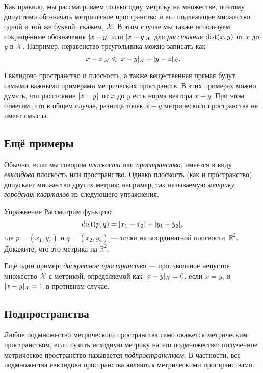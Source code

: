 \begin{multicols}{2}
{Как правило, мы рассматриваем только одну метрику на множестве, поэтому допустимо обозначать метрическое пространство и его подлежащее множество одной и той же буквой, скажем, $\mathcal{X}$.
В этом случае мы также используем сокращённые обозначения $\dist{x}{y}{}$ или $\dist{x}{y}{\spc{X}}$ для \emph{расстояния} $\mathop{\rm dist}\nolimits(x,y)$ от $x$ до $y$ в $\mathcal{X}$.
Например, неравенство треугольника можно записать как
$$\dist{x}{z}{\spc{X}}\le \dist{x}{y}{\spc{X}}+\dist{y}{z}{\spc{X}}.$$

Евклидово пространство и плоскость, а также вещественная прямая будут самыми важными примерами метрических пространств.
В этих примерах можно думать, что расстояние $\dist{x}{y}{}$ от $x$ до $y$ есть норма вектора $x-y$.
При этом отметим, что в общем случае, разница точек $x-y$ метрического пространства не имеет смысла.

\subsection*{Ещё примеры}

Обычно, если мы говорим \emph{плоскость} или \emph{пространство}, имеется в виду \emph{евклидова} плоскость или пространство.
Однако плоскость (как и пространство) допускает множество других метрик; например, так называемую \emph{метрику городских кварталов} из следующего упражнения.

\begin{thm}{Упражнение}\label{ex:ell-infty}
Рассмотрим функцию
$$\mathop{\rm dist}\nolimits(p,q)=|x_1-x_2|+|y_1-y_2|,$$
где $p=(x_1,y_1)$ и $q=(x_2,y_2)$ --- точки на координатной плоскости~$\mathbb{R}^2$.
Докажите, что это метрика на $\mathbb{R}^2$.
\end{thm}

Ещё один пример: \emph{дискретное пространство} --- произвольное непустое множество $\mathcal{X}$ с метрикой, определяемой как $\dist{x}{y}{\spc{X}}=0$, если $x=y$, и $\dist{x}{y}{\spc{X}}=1$ в противном случае.

\subsection*{Подпространства}

{\sloppy

Любое подмножество метрического пространства само окажется метрическим пространством, если сузить исходную метрику на это подмножество;
полученное метрическое пространство называется \emph{подпространством}.
В частности, все подмножества евклидова пространства являются метрическими пространствами.

}}
\end{multicols}
